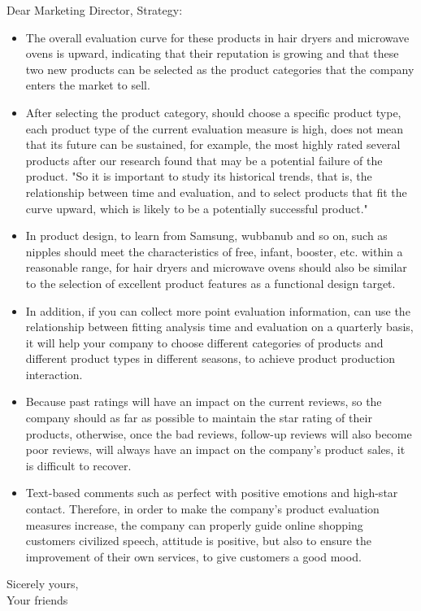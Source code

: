 \documentclass{mcmthesis}
\begin{document}
\begin{letter}{Dear Marketing Director,}
Strategy:
\begin{itemize}
\item The overall evaluation curve for these products in hair dryers and microwave ovens is upward, indicating that their reputation is growing and that these two new products can be selected as the product categories that the company enters the market to sell.
\item  After selecting the product category, should choose a specific product type, each product type of the current evaluation measure is high, does not mean that its future can be sustained, for example, the most highly rated several products after our research found that may be a potential failure of the product. "So it is important to study its historical trends, that is, the relationship between time and evaluation, and to select products that fit the curve upward, which is likely to be a potentially successful product."
\item In product design, to learn from Samsung, wubbanub and so on, such as nipples should meet the characteristics of free, infant, booster, etc. within a reasonable range, for hair dryers and microwave ovens should also be similar to the selection of excellent product features as a functional design target.
\item In addition, if you can collect more point evaluation information, can use the relationship between fitting analysis time and evaluation on a quarterly basis, it will help your company to choose different categories of products and different product types in different seasons, to achieve product production interaction.
\item Because past ratings will have an impact on the current reviews, so the company should as far as possible to maintain the star rating of their products, otherwise, once the bad reviews, follow-up reviews will also become poor reviews, will always have an impact on the company's product sales, it is difficult to recover.
\item Text-based comments such as perfect with positive emotions and high-star contact. Therefore, in order to make the company's product evaluation measures increase, the company can properly guide online shopping customers civilized speech, attitude is positive, but also to ensure the improvement of their own services, to give customers a good mood.
\end{itemize}

	\vspace{\parskip}
	Sicerely yours,\\
	Your friends
\end{letter}
\end{document}
